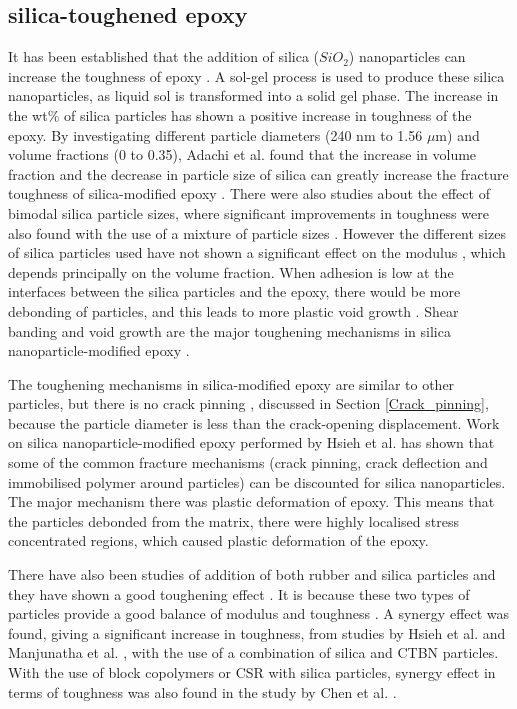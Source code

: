 \documentclass[numbers=noendperiod,chapterprefix=on]{icldt} %
\begin{document}
\subsection{silica-toughened epoxy}
It has been established that the addition of silica ($SiO_2$) nanoparticles can increase the toughness of epoxy \cite{Mohammed2008,Imanaka2001}. A sol-gel process is used to produce these silica nanoparticles, as liquid sol is transformed into a solid gel phase. The increase in the wt\% of silica particles has shown a positive increase in toughness of the epoxy. By investigating different particle diameters (240 nm to 1.56 $ \mu $m) and volume fractions (0 to 0.35), Adachi et al. \cite{Adachi2008} found that the increase in volume fraction and the decrease in particle size of silica can greatly increase the fracture toughness of silica-modified epoxy \cite{Adachi2008}. There were also studies about the effect of bimodal silica particle sizes, where significant improvements in toughness were also found with the use of a mixture of particle sizes \cite{Dittanet2013a}. However the different sizes of silica particles used have not shown a significant effect on the modulus \cite{Dittanet2012}, which depends principally on the volume fraction. 
When adhesion is low at the interfaces between the silica particles and the epoxy, there would be more debonding of particles, and this leads to more plastic void growth \cite{Imanaka2001,Adachi2008,Johnsen2005}. Shear banding and void growth are the major toughening mechanisms in silica nanoparticle-modified epoxy \cite{Dittanet2012}. 


The toughening mechanisms in silica-modified epoxy are similar to other particles, but there is no crack pinning \cite{Mohammed2008,Adachi2008}, discussed in Section \ref{Crack_pinning}, because the particle diameter is less than the crack-opening displacement. Work on silica nanoparticle-modified epoxy performed by Hsieh et al. \cite{Adachi2008} has shown that some of the common fracture mechanisms (crack pinning, crack deflection and immobilised polymer around particles) can be discounted for silica nanoparticles. The major mechanism there was plastic deformation of epoxy. This means that the particles debonded from the matrix, there were highly localised stress concentrated regions, which caused plastic deformation of the epoxy. 

There have also been studies of addition of both rubber and silica particles and they have shown a good toughening effect \cite{Kinloch2012}. It is because these two types of particles provide a good balance of modulus and toughness \cite{Liu2011a}. A synergy effect was found, giving a significant increase in toughness, from studies by Hsieh et al. \cite{Hsieh2010} and Manjunatha et al. \cite{Liu2011a}, with the use of a combination of silica and CTBN particles. With the use of block copolymers or CSR with silica particles, synergy effect in terms of toughness was also found in the study by Chen et al. \cite{Chen2013a,Chen2013}. 
\end{document}
